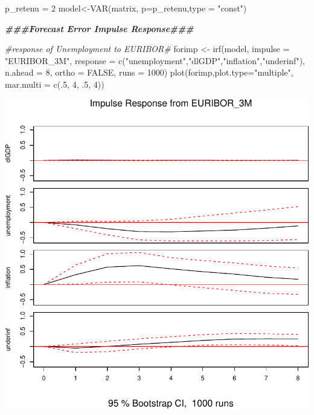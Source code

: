 \documentclass[
  10pt,
  ,
  french,
  a4paper]{article}
\newenvironment{Shaded}{\begin{snugshade}}{\end{snugshade}}
\newcommand{\AttributeTok}[1]{\textcolor[rgb]{0.77,0.63,0.00}{#1}}
\newcommand{\CommentTok}[1]{\textcolor[rgb]{0.56,0.35,0.01}{\textit{#1}}}
\newcommand{\ConstantTok}[1]{\textcolor[rgb]{0.00,0.00,0.00}{#1}}
\newcommand{\DecValTok}[1]{\textcolor[rgb]{0.00,0.00,0.81}{#1}}
\newcommand{\DocumentationTok}[1]{\textcolor[rgb]{0.56,0.35,0.01}{\textbf{\textit{#1}}}}
\newcommand{\FunctionTok}[1]{\textcolor[rgb]{0.00,0.00,0.00}{#1}}
\newcommand{\NormalTok}[1]{#1}
\newcommand{\OtherTok}[1]{\textcolor[rgb]{0.56,0.35,0.01}{#1}}
\newcommand{\StringTok}[1]{\textcolor[rgb]{0.31,0.60,0.02}{#1}}
\begin{document}
\begin{Shaded}
\begin{Highlighting}[]
\NormalTok{p\_retenu }\OtherTok{=} \DecValTok{2}
\NormalTok{model}\OtherTok{\textless{}{-}}\FunctionTok{VAR}\NormalTok{(matrix, }\AttributeTok{p=}\NormalTok{p\_retenu,}\AttributeTok{type =} \StringTok{"const"}\NormalTok{)}

\DocumentationTok{\#\#\#Forecast Error Impulse Response\#\#\#}

\CommentTok{\#response of Unemployment to EURIBOR\#}
\NormalTok{forimp }\OtherTok{\textless{}{-}} \FunctionTok{irf}\NormalTok{(model, }\AttributeTok{impulse =} \StringTok{"EURIBOR\_3M"}\NormalTok{,}
           \AttributeTok{response =} \FunctionTok{c}\NormalTok{(}\StringTok{"unemployment"}\NormalTok{,}\StringTok{"dlGDP"}\NormalTok{,}\StringTok{"inflation"}\NormalTok{,}\StringTok{"underinf"}\NormalTok{),}
           \AttributeTok{n.ahead =} \DecValTok{8}\NormalTok{, }\AttributeTok{ortho =} \ConstantTok{FALSE}\NormalTok{, }\AttributeTok{runs =} \DecValTok{1000}\NormalTok{)}
\FunctionTok{plot}\NormalTok{(forimp,}\AttributeTok{plot.type=}\StringTok{"multiple"}\NormalTok{,}
     \AttributeTok{mar.multi =} \FunctionTok{c}\NormalTok{(.}\DecValTok{5}\NormalTok{, }\DecValTok{4}\NormalTok{, .}\DecValTok{5}\NormalTok{, }\DecValTok{4}\NormalTok{))}
\end{Highlighting}
\end{Shaded}

\includegraphics{img/markdown-unnamed-chunk-1-1.pdf}
\end{document}
